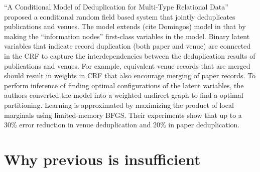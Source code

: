 \documentclass[]{article}
\begin{document}
``A Conditional Model of Deduplication for Multi-Type Relational Data'' proposed a conditional random field based system that jointly deduplicates publications and venues.  The model extends (cite Domingos) model in that by making the ``information nodes'' first-class variables in the model.  Binary latent variables that indicate record duplication (both paper and venue) are connected in the CRF to capture the interdependencies between the deduplication results of publications and venues.  For example, equivalent venue records that are merged should result in weights in CRF that also encourage merging of paper records.  To perform inference of finding optimal configurations of the latent variables, the authors converted the model into a weighted undirect graph to find a optimal partitioning.  Learning is approximated by maximizing the product of local marginals using limited-memory BFGS.  Their experiments show that up to a 30\% error reduction in venue deduplication and 20\% in paper deduplication.

\section{Why previous is insufficient} %
\label{sec:why_previous_is_insufficient}




\end{document}
